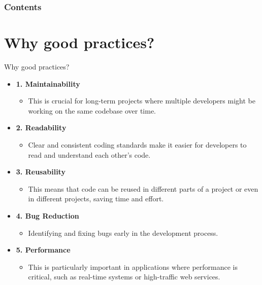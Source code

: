 \documentclass[10pt]{beamer}
\title[Universidad Panamericana]{}
\subtitle{Professional Workflow}
\author[]{Name}
\institute[ltonix@up.edu.mx]{Universidad Panamericana}
\date[Presentation \today]{Presentation \today}
\begin{document}
\frame{\titlepage}
\begin{frame}
\frametitle{Contents}
\tableofcontents
\end{frame}

\section{Why good practices?}
\begin{frame} {Why good practices?}
    \begin{itemize}
      \item \textbf{1. Maintainability}
      \begin{itemize}
        \item This is crucial for long-term projects where multiple developers might be working on the same codebase over time.
      \end{itemize}
      \item \textbf{2. Readability}
      \begin{itemize}
        \item Clear and consistent coding standards make it easier for developers to read and understand each other's code.
      \end{itemize}
      \item \textbf{3. Reusability}
      \begin{itemize}
        \item This means that code can be reused in different parts of a project or even in different projects, saving time and effort.
      \end{itemize}
      \item \textbf{4. Bug Reduction}
      \begin{itemize}
        \item Identifying and fixing bugs early in the development process.
      \end{itemize}
      \item \textbf{5. Performance}
      \begin{itemize}
        \item This is particularly important in applications where performance is critical, such as real-time systems or high-traffic web services.
      \end{itemize}
    \end{itemize}
  
\end{frame}
\end{document}
